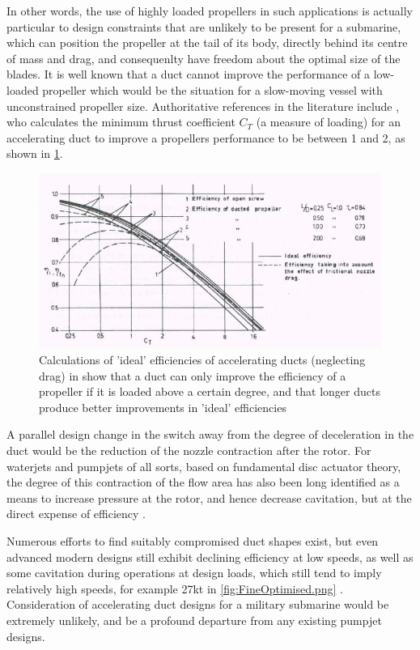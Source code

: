 \documentclass{article}\usepackage[]{graphicx}\usepackage[]{color}
\begin{document}
In other words, the use of highly loaded propellers in such applications is actually particular to design constraints that are unlikely to be present for a submarine, which can position the propeller at the tail of its body, directly behind its centre of mass and drag, and consequenlty have freedom about the optimal size of the blades.  It is well known that a duct cannot improve the performance of a low-loaded propeller which would be the situation for a slow-moving vessel with unconstrained propeller size.  Authoritative references in the literature include \cite{oosterveld1970}, who calculates the minimum thrust coefficient $C_T$ (a measure of loading) for an accelerating duct to improve a propellers performance to be between 1 and 2, as shown in \ref{fig:AcceleratingIdeal.png}.

\begin{figure}
\includegraphics[width=\textwidth]{AcceleratingIdeal.png}
\caption{Calculations of 'ideal' efficiencies of accelerating ducts (neglecting drag) in \cite{oosterveld1970} show that a duct can only improve the efficiency of a propeller if it is loaded above a certain degree, and that longer ducts produce better improvements in 'ideal' efficiencies}
\label{fig:AcceleratingIdeal.png}
\end{figure}

A parallel design change in the switch away from the degree of deceleration in the duct would be the reduction of the nozzle contraction after the rotor.  For waterjets and pumpjets of all sorts, based on fundamental disc actuator theory, the degree of this contraction of the flow area has also been long identified as a means to increase pressure at the rotor, and hence decrease cavitation, but at the direct expense of efficiency \parencite[14]{van1996waterjet}.

Numerous efforts to find suitably compromised duct shapes exist, but even advanced modern designs still exhibit declining efficiency at low speeds, as well as some cavitation during operations at design loads, which still tend to imply relatively high speeds, for example 27kt in \ref{fig:FineOptimised.png} .  Consideration of accelerating duct designs for a military submarine would be extremely unlikely, and be a profound departure from any existing pumpjet designs.
\end{document}
